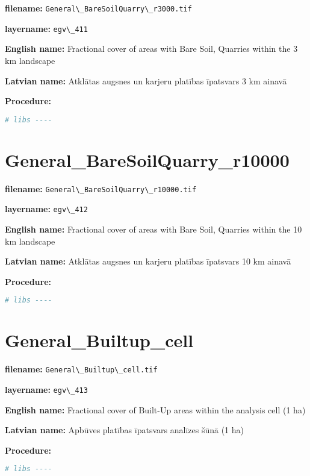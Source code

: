 \documentclass[
]{book}
\newcommand{\passthrough}[1]{#1}
\begin{document}
\textbf{filename:} \passthrough{\lstinline!General\_BareSoilQuarry\_r3000.tif!}

\textbf{layername:} \passthrough{\lstinline!egv\_411!}

\textbf{English name:} Fractional cover of areas with Bare Soil, Quarries within the 3 km landscape

\textbf{Latvian name:} Atklātas augsnes un karjeru platības īpatsvars 3 km ainavā

\textbf{Procedure:}

\begin{lstlisting}[language=R]
# libs ----
\end{lstlisting}

\section{General\_BareSoilQuarry\_r10000}\label{ch06.412}

\textbf{filename:} \passthrough{\lstinline!General\_BareSoilQuarry\_r10000.tif!}

\textbf{layername:} \passthrough{\lstinline!egv\_412!}

\textbf{English name:} Fractional cover of areas with Bare Soil, Quarries within the 10 km landscape

\textbf{Latvian name:} Atklātas augsnes un karjeru platības īpatsvars 10 km ainavā

\textbf{Procedure:}

\begin{lstlisting}[language=R]
# libs ----
\end{lstlisting}

\section{General\_Builtup\_cell}\label{ch06.413}

\textbf{filename:} \passthrough{\lstinline!General\_Builtup\_cell.tif!}

\textbf{layername:} \passthrough{\lstinline!egv\_413!}

\textbf{English name:} Fractional cover of Built-Up areas within the analysis cell (1 ha)

\textbf{Latvian name:} Apbūves platības īpatsvars analīzes šūnā (1 ha)

\textbf{Procedure:}

\begin{lstlisting}[language=R]
# libs ----
\end{lstlisting}
\end{document}
